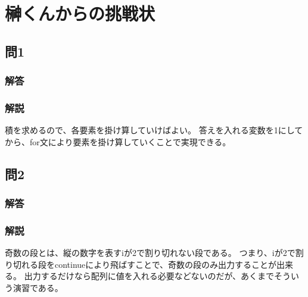\section{榊くんからの挑戦状}
\subsection{問1}
\subsubsection{解答}

\subsubsection{解説}
積を求めるので、各要素を掛け算していけばよい。
答えを入れる変数を1にしてから、for文により要素を掛け算していくことで実現できる。


\subsection{問2}
\subsubsection{解答}

\subsubsection{解説}
奇数の段とは、縦の数字を表すiが2で割り切れない段である。
つまり、iが2で割り切れる段をcontinueにより飛ばすことで、奇数の段のみ出力することが出来る。
出力するだけなら配列に値を入れる必要などないのだが、あくまでそういう演習である。

